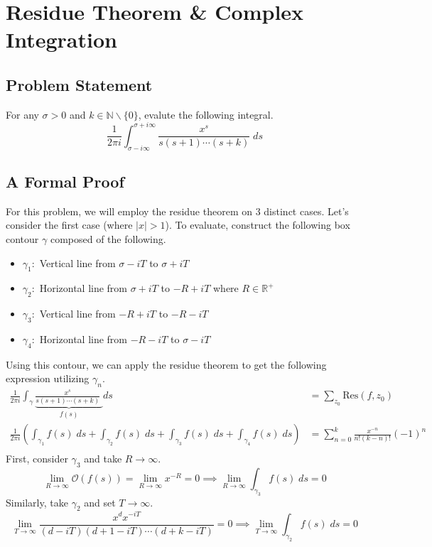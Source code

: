 \section{Residue Theorem & Complex Integration}
\subsection{Problem Statement}
For any $\sigma > 0$ and $k \in \mathbb{N} \backslash \{0\}$, evalute the following integral.
$$
\frac{1}{2\pi i} \int_{\sigma - i\infty}^{\sigma + i\infty} \frac{x^s}{s(s+1)\cdots(s+k)}\;ds
$$
\subsection{A Formal Proof}
For this problem, we will employ the residue theorem on $3$ distinct cases. Let's consider the first case (where $|x| > 1$). To evaluate, construct the following box contour $\gamma$ composed of the following.
\begin{itemize}
    \item $\gamma_{1}:$ Vertical line from $\sigma - iT$ to $\sigma + iT$
    \item $\gamma_{2}:$ Horizontal line from $\sigma + iT$ to $- R + iT$ where $R \in \mathbb{R}^+$
    \item $\gamma_{3}:$ Vertical line from $-R + iT$ to $-R - iT$
    \item $\gamma_4:$ Horizontal line from $-R - iT$ to $\sigma - iT$
\end{itemize}
Using this contour, we can apply the residue theorem to get the following expression utilizing $\gamma_n$.
\begin{align*}
    \frac{1}{2\pi i} \int_{\gamma} \underbrace{\frac{x^s}{s(s+1)\cdots(s+k)}\;}_{f(s)}ds &= \sum_{z_0} \text{Res}(f,z_0) \\
    \frac{1}{2\pi i} \left(\int_{\gamma_1} f(s)\;ds + \int_{\gamma_2} f(s)\;ds + \int_{\gamma_3} f(s)\;ds + \int_{\gamma_4} f(s)\;ds \right)&= \sum_{n=0}^k \frac{x^{-n}}{n!(k-n)!} (-1)^n\\
\end{align*}
First, consider $\gamma_3$ and take $R \rightarrow \infty$. 
$$
\lim_{R\rightarrow \infty} \mathcal{O}(f(s)) = \lim_{R\rightarrow \infty} x^{-R} = 0 \implies \lim_{R\rightarrow\infty} \int_{\gamma_{3}} f(s)\;ds = 0
$$
Similarly, take $\gamma_2$ and set $T\rightarrow \infty$.
$$
\lim_{T\rightarrow\infty} \frac{x^{d}x^{-iT}}{(d - iT)(d + 1 - iT)\cdots(d+k - iT)} = 0 \implies \lim_{T\rightarrow \infty} \int_{\gamma_2} f(s)\;ds = 0
$$
